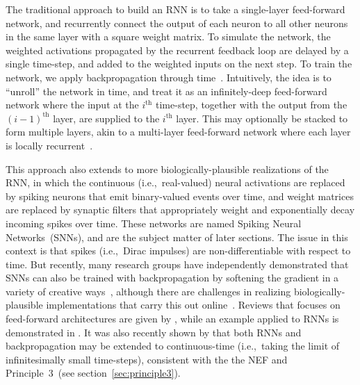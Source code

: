 The traditional approach to build an RNN is to take a single-layer feed-forward network, and recurrently connect the output of each neuron to all other neurons in the same layer with a square weight matrix.
To simulate the network, the weighted activations propagated by the recurrent feedback loop are delayed by a single time-step, and added to the weighted inputs on the next step.
To train the network, we apply backpropagation through time~\citep[BPTT;][]{werbos1990backpropagation}.
Intuitively, the idea is to ``unroll'' the network in time, and treat it as an infinitely-deep feed-forward network where the input at the $i^\text{th}$ time-step, together with the output from the $(i-1)^\text{th}$ layer, are supplied to the $i^\text{th}$ layer.
This may optionally be stacked to form multiple layers, akin to a multi-layer feed-forward network where each layer is locally recurrent~\citep{pascanu2013construct}.

This approach also extends to more biologically-plausible realizations of the RNN, in which the continuous (i.e.,~real-valued) neural activations are replaced by spiking neurons that emit binary-valued events over time, and weight matrices are replaced by synaptic filters that appropriately weight and exponentially decay incoming spikes over time.
These networks are named Spiking Neural Networks~(SNNs), and are the subject matter of later sections.
The issue in this context is that spikes (i.e.,~Dirac impulses) are non-differentiable with respect to time.
But recently, many research groups have independently demonstrated that SNNs can also be trained with backpropagation by softening the gradient in a variety of creative ways~\citep{esser2015backpropagation, hunsberger2015spiking, hunsberger2016training, lee2016training, marblestone2016toward, neftci2017neuromorphic, bellec2018long, hunsberger2018, huh2018gradient, severa2018whetstone, rasmussen2018nengodl, shrestha2018slayer, neftci2019surrogate}, although there are challenges in realizing biologically-plausible implementations that carry this out online~\citep[][submitted]{hunsberger2018, stockel2019align}.
Reviews that focuses on feed-forward architectures are given by \citet{pfeiffer2018deep, tavanaei2018deep}, while an example applied to RNNs is demonstrated in \citet{diehl2016conversion}.
It was also recently shown by \citet{chen2018neural} that both RNNs and backpropagation may be extended to continuous-time (i.e.,~taking the limit of infinitesimally small time-steps), consistent with the the NEF and Principle~3~(see section~\ref{sec:principle3}).
 
